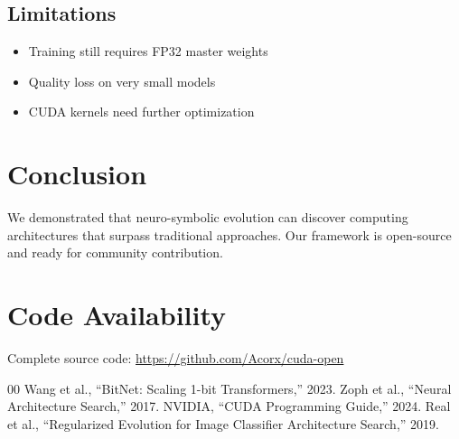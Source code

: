 \documentclass[10pt,conference]{IEEEtran}
\begin{document}
\subsection{Limitations}

\begin{itemize}
    \item Training still requires FP32 master weights
    \item Quality loss on very small models
    \item CUDA kernels need further optimization
\end{itemize}

\section{Conclusion}

We demonstrated that neuro-symbolic evolution can discover computing architectures that surpass traditional approaches. Our framework is open-source and ready for community contribution.

\section*{Code Availability}

Complete source code: \url{https://github.com/Acorx/cuda-open}

\begin{thebibliography}{00}
 Wang et al., ``BitNet: Scaling 1-bit Transformers,'' 2023.
 Zoph et al., ``Neural Architecture Search,'' 2017.
 NVIDIA, ``CUDA Programming Guide,'' 2024.
 Real et al., ``Regularized Evolution for Image Classifier Architecture Search,'' 2019.
\end{thebibliography}
\end{document}
